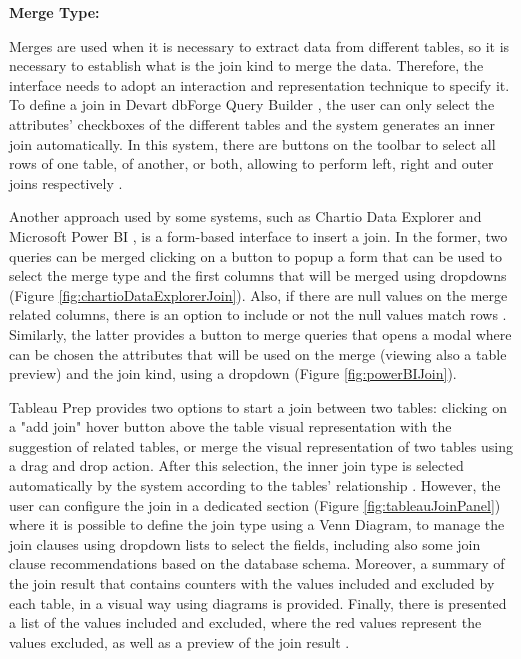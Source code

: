 \textbf{Merge Type:}



Merges are used when it is necessary to extract data from different tables, so it is necessary to establish what is the join kind to merge the data. Therefore, the interface needs to adopt an interaction and representation technique to specify it. To define a join in Devart dbForge Query Builder \cite{dbForgeQueryBuilder}, the user can only select the attributes’ checkboxes of the different tables and the system generates an inner join automatically. In this system, there are buttons on the toolbar to select all rows of one table, of another, or both, allowing to perform left, right and outer joins respectively \cite{dbForgeMakingJoinsBetweenTables}.
  
Another approach used by some systems, such as Chartio Data Explorer \cite{chartioDataExplorer} and Microsoft Power BI \cite{powerBI}, is a form-based interface to insert a join. In the former, two queries can be merged clicking on a button to popup a form that can be used to select the merge type and the first columns that will be merged using dropdowns \cite{chartioDataExplorer} (Figure \ref{fig:chartioDataExplorerJoin}). Also, if there are null values on the merge related columns, there is an option to include or not the null values match rows \cite{chartioJoiningDataAcrossDatabases}. Similarly, the latter provides a button to merge queries that opens a modal where can be chosen the attributes that will be used on the merge (viewing also a table preview) and the join kind, using a dropdown \cite{powerBIShapeAndCombineData} (Figure \ref{fig:powerBIJoin}).
  
Tableau Prep \cite{tableauPrep} provides two options to start a join between two tables: clicking on a "add join" hover button above the table visual representation with the suggestion of related tables, or merge the visual representation of two tables using a drag and drop action. After this selection, the inner join type is selected automatically by the system according to the tables' relationship \cite{tableauAggregateJoinOrUnionData} \cite{tableauAddMoreDataInTheInputStep}. However, the user can configure the join in a dedicated section (Figure \ref{fig:tableauJoinPanel}) where it is possible to define the join type using a Venn Diagram, to manage the join clauses using dropdown lists to select the fields, including also some join clause recommendations based on the database schema. Moreover, a summary of the join result that contains counters with the values included and excluded by each table, in a visual way using diagrams is provided. Finally, there is presented a list of the values included and excluded, where the red values represent the values excluded, as well as a preview of the join result \cite{tableauAggregateJoinOrUnionData}.

